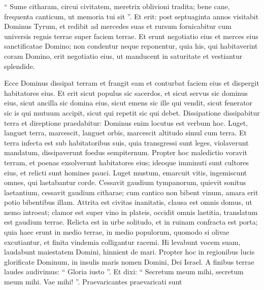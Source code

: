 \begin{biblechapter}
\begin{biblechapter}
\begin{biblechapter}
\begin{biblechapter}
\begin{biblechapter}
\begin{biblechapter}
\begin{biblechapter}
\begin{biblechapter}
\begin{biblechapter}
\begin{biblechapter}
\begin{biblechapter}
\begin{biblechapter}
\begin{biblechapter}
\begin{biblechapter}
\begin{biblechapter}
\begin{biblechapter}
\begin{biblechapter}
\begin{biblechapter}
\begin{biblechapter}
\begin{biblechapter}
\begin{biblechapter}
\begin{biblechapter}
\begin{biblechapter}
 \verse “ Sume citharam, circui civitatem,
 meretrix oblivioni tradita;
 bene cane, frequenta canticum,
 ut memoria tui sit ”.
 \verse Et erit: post septuaginta annos visitabit Dominus Tyrum, et redibit ad mercedes suas et rursum fornicabitur cum universis regnis terrae super faciem terrae. 
\verse Et erunt negotiatio eius et merces eius sanctificatae Domino; non condentur neque reponentur, quia his, qui habitaverint coram Domino, erit negotiatio eius, ut manducent in saturitate et vestiantur splendide.
 
\begin{biblechapter}
\verse Ecce Dominus dissipat terram et frangit eam
 et conturbat faciem eius
 et dispergit habitatores eius.
 \verse Et erit sicut populus sic sacerdos,
 et sicut servus sic dominus eius,
 sicut ancilla sic domina eius,
 sicut emens sic ille qui vendit,
 sicut fenerator sic is qui mutuum accipit,
 sicut qui repetit sic qui debet.
 \verse Dissipatione dissipabitur terra
 et direptione praedabitur:
 Dominus enim locutus est verbum hoc.
 \verse Luget, languet terra,
 marcescit, languet orbis,
 marcescit altitudo simul cum terra. 
\verse Et terra infecta est sub habitatoribus suis,
 quia transgressi sunt leges,
 violaverunt mandatum,
 dissipaverunt foedus sempiternum.
 \verse Propter hoc maledictio voravit terram,
 et poenas exsolverunt habitatores eius;
 ideoque imminuti sunt cultores eius,
 et relicti sunt homines pauci.
 \verse Luget mustum,
 emarcuit vitis,
 ingemiscunt omnes, qui laetabantur corde.
 \verse Cessavit gaudium tympanorum,
 quievit sonitus laetantium,
 cessavit gaudium citharae;
 \verse cum cantico non bibent vinum,
 amara erit potio bibentibus illam.
 \verse Attrita est civitas inanitatis,
 clausa est omnis domus, ut nemo introeat;
 \verse clamor est super vino in plateis,
 occidit omnis laetitia,
 translatum est gaudium terrae.
 \verse Relicta est in urbe solitudo,
 et in ruinam confracta est porta;
 \verse quia haec erunt in medio terrae,
 in medio populorum,
 quomodo si olivae excutiantur,
 et finita vindemia colligantur racemi.
 \verse Hi levabunt vocem suam,
 laudabunt maiestatem Domini,
 hinnient de mari.
 \verse Propter hoc in regionibus lucis glorificate Dominum,
 in insulis maris nomen Domini, Dei Israel.
 \verse A finibus terrae laudes audivimus:
 “ Gloria iusto ”.
 Et dixi: “ Secretum meum mihi,
 secretum meum mihi.
 Vae mihi! ”.
 Praevaricantes praevaricati sunt

\end{biblechapter}
\end{biblechapter}
\end{biblechapter}
\end{biblechapter}
\end{biblechapter}
\end{biblechapter}
\end{biblechapter}
\end{biblechapter}
\end{biblechapter}
\end{biblechapter}
\end{biblechapter}
\end{biblechapter}
\end{biblechapter}
\end{biblechapter}
\end{biblechapter}
\end{biblechapter}
\end{biblechapter}
\end{biblechapter}
\end{biblechapter}
\end{biblechapter}
\end{biblechapter}
\end{biblechapter}
\end{biblechapter}
\end{biblechapter}
